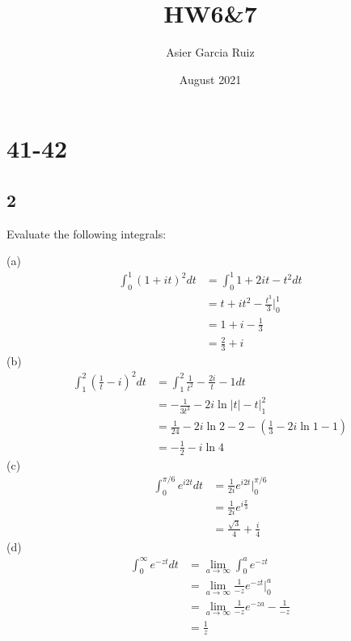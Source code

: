 \documentclass{article}
\title{HW6\&7}
\author{Asier Garcia Ruiz }
\date{August 2021}
\begin{document}
\maketitle

\section*{41-42}
\subsection*{2} %
Evaluate the following integrals:

(a)
\begin{align*}
    \int_0^1 (1 + it)^2 dt & = \int_0^1 1 + 2it - t^2 dt          \\
                           & = t + it^2 - \frac{t^3}{3} \Big|_0^1 \\
                           & = 1 + i - \frac{1}{3}                \\
                           & = \frac{2}{3} + i
\end{align*}
(b)
\begin{align*}
    \int_1^2\left(\frac{1}{t}-i\right)^2dt & = \int_1^2 \frac{1}{t^2} -\frac{2i}{t} -1 dt          \\
                                           & = -\frac{1}{3t^3} -2i\ln |t| -t \Big |_1^2            \\
                                           & = \frac{1}{24} -2i\ln 2 -2 -(\frac{1}{3} -2i\ln 1 -1) \\
                                           & = -\frac{1}{2} - i\ln 4
\end{align*}
(c)
\begin{align*}
    \int_0^{\pi/6} e^{i2t} dt & =\frac{1}{2i}e^{i2t} \Big |_0^{\pi/6} \\
                              & =\frac{1}{2i} e^{i\frac{\pi}{3}}      \\
                              & =\frac{\sqrt{3}}{4} + \frac{i}{4}
\end{align*}
(d)
\begin{align*}
    \int_0^\infty e^{-zt} dt & = \lim_{a \rightarrow \infty} \int_0^a e^{-zt}                     \\
                             & = \lim_{a \rightarrow \infty} \frac{1}{-z}e^{-zt} \Big |_0^a       \\
                             & =  \lim_{a \rightarrow \infty}  \frac{1}{-z}e^{-za} - \frac{1}{-z} \\
                             & = \frac{1}{z}
\end{align*}
\end{document}
